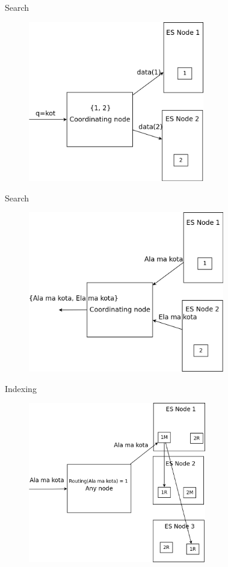 \documentclass{beamer}
\begin{document}
\begin{frame}{Search}
	\begin{figure}
		\includegraphics[width=\textwidth,height=7cm,keepaspectratio=true]{search3}
	\end{figure}
\end{frame}
\begin{frame}{Search}
	\begin{figure}
		\includegraphics[width=\textwidth,height=7cm,keepaspectratio=true]{search4}
	\end{figure}
\end{frame}
\begin{frame}{Indexing}
	\begin{figure}
		\includegraphics[width=\textwidth,height=7cm,keepaspectratio=true]{indexing}
	\end{figure}
\end{frame}
\end{document}
